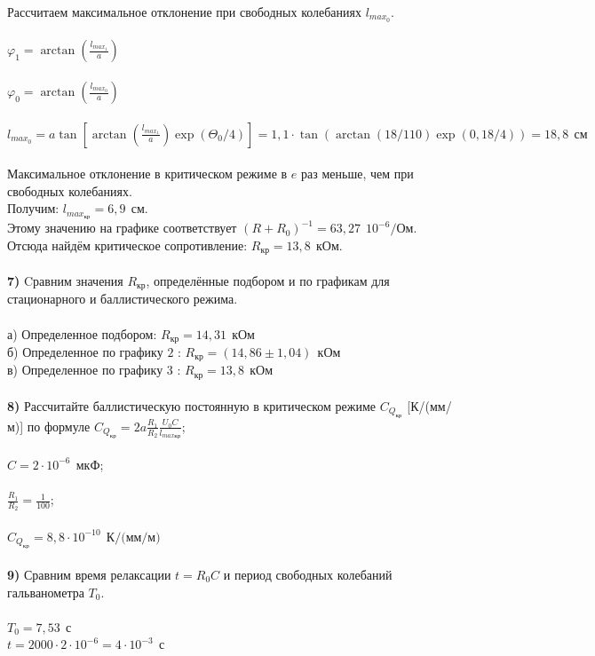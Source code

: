 \documentclass[11pt,a4paper]{article}
\begin{document}
Рассчитаем максимальное отклонение при свободных колебаниях $l_{max_0}$.
\\\\
$\varphi_1 = \arctan (\frac {l_{max_1}}{a})$ \\\\
$\varphi_0 = \arctan (\frac {l_{max_0}}{a})$ \\\\
$l_{max_0} = a \tan [\arctan(\frac{l_{max_1}}{a}) \exp (\Theta_0 / 4)] = 1,1 \cdot \tan (\arctan (18/110) \exp(0,18/4)) = 18,8 \ \ \text{см}$
\\\\
Максимальное отклонение в критическом режиме в $e$ раз меньше, чем при свободных колебаниях. \\
Получим: $l_{max_{\text{кр}}} = 6,9 \ \ \text{см}$. \\
Этому значению на графике соответствует $(R+R_0)^{-1} = 63,27 \ \ 10^{-6}/\text{Ом}$. Отсюда найдём критическое сопротивление: $R_{\text{кр}} = 13,8 \ \  \text{кОм}$.
\\\\
\textbf{7)} Cравним значения $R_{\text{кр}}$, определённые подбором и по графикам для стационарного и баллистического режима. \\\\
а) Определенное подбором: $R_{\text{кр}} = 14,31 \ \ \text{кОм}$ \\
б) Определенное по графику $2$ : $R_{\text{кр}} =  (14,86 \pm 1,04)\ \ \text{кОм}$ \\
в) Определенное по графику $3$ : $R_{\text{кр}} =  13,8 \ \ \text{кОм}$ \\\\
\textbf{8)} Рассчитайте баллистическую постоянную в критическом режиме $C_{Q_{\text{кр}}}$ [К/(мм/м)] 
по формуле $C_{Q_{\text{кр}}} = 2a \frac{R_1}{R_2} \frac {U_0 C}{l_{max \text{кр}}}$;\\\\
$C = 2 \cdot 10^{-6} \ \ \text{мкФ}$;\\\\
$\frac{R_1}{R_2} = \frac{1}{100}$;
\\\\
$C_{Q_{\text{кр}}} = 8,8 \cdot 10^{-10} \ \ \text{К/(мм/м)}$
\\\\
\textbf{9)} Сравним время релаксации $t = R_0 C$ и период свободных колебаний гальванометра $T_0$.
\\\\
$T_0 = 7,53 \ \ \text{с}$ \\
$t = 2000 \cdot 2 \cdot 10^{-6} = 4 \cdot 10^{-3} \ \ \text{с} $
\end{document}
